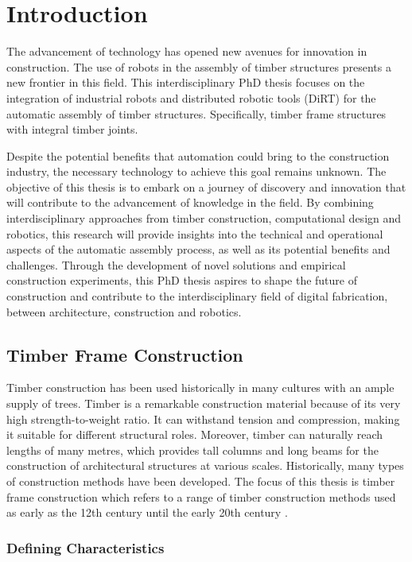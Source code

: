 \chapter{Introduction}

The advancement of technology has opened new avenues for innovation in construction.
The use of robots in the assembly of timber structures presents a new frontier in this field.
This interdisciplinary PhD thesis focuses on the integration of industrial robots and distributed robotic tools (DiRT) for the automatic assembly of timber structures.
Specifically, timber frame structures with integral timber joints. 

Despite the potential benefits that automation could bring to the construction industry, the necessary technology to achieve this goal remains unknown. The objective of this thesis is to embark on a journey of discovery and innovation that will contribute to the advancement of knowledge in the field.
By combining interdisciplinary approaches from timber construction, computational design and robotics, this research will provide insights into the technical and operational aspects of the automatic assembly process, as well as its potential benefits and challenges.
Through the development of novel solutions and empirical construction experiments, this PhD thesis aspires to shape the future of construction and contribute to the interdisciplinary field of digital fabrication, between architecture, construction and robotics.

\section{Timber Frame Construction}
\label{sec:timberframeconstruction}
Timber construction has been used historically in many cultures with an ample supply of trees.
Timber is a remarkable construction material because of its very high strength-to-weight ratio.
It can withstand tension and compression, making it suitable for different structural roles. Moreover, timber can naturally reach lengths of many metres, which provides tall columns and long beams for the construction of architectural structures at various scales.
Historically, many types of construction methods have been developed. The focus of this thesis is timber frame construction which refers to a range of timber construction methods used as early as the 12th century until the early 20th century \parencite{sobonTimberFrameConstruction1984}.

\subsection{Defining Characteristics}
\label{subsec:timberframeconstruction/definingcharacteristics}

